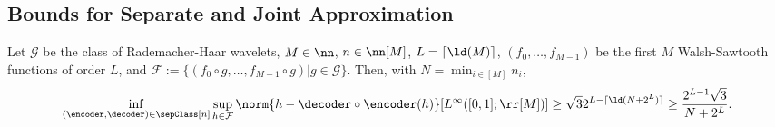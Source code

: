 \documentclass[twoside,11pt]{article}
\newcommand{\defeq}{\mathbin{:=}}
\newcommand{\set}[1]{\ensuremath{\mathcal{#1}}}
\begin{document}
\subsection{Bounds for Separate and Joint Approximation}
\label{sec:sep_joint_bounds}
\begin{theorem}
    \label{thm:wavelet_separated}
    Let $\set{G}$ be the class of Rademacher-Haar wavelets, $M\in\nn$, $n\in\nn[M]$, $L=\lceil\ld(M)\rceil$, $(f_0,\ldots,f_{M-1})$ be the first $M$ Walsh-Sawtooth functions of order $L$, and $\set{F}\defeq \{(f_0\circ g,\ldots,f_{M-1}\circ g)|g\in\set{G}\}$.
    Then, with $N=\min_{i\in[M]}n_i$,
    \begin{align}
        \inf_{(\encoder,\decoder)\in\sepClass[n]}
        \sup_{h\in\set{F}}
        \norm{h-\decoder\circ\encoder(h)}[{L^\infty([0,1];\rr[M])}]
        \geq
        \sqrt{3}
        2^{L-\lceil\ld(N+2^{L})\rceil}
        \geq
        \frac{2^{L-1}\sqrt{3}}{N+2^{L}}.
    \end{align}
\end{theorem}
\end{document}
